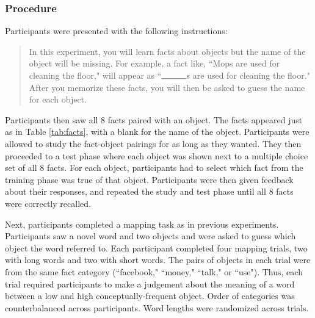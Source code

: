 \subsubsection{Procedure}
Participants were presented with the following instructions:

\begin{quote}
In this experiment, you will learn facts about objects but the name of the object will be missing. For example, a fact like, ``Mops are used for cleaning the floor," will appear as ``$\rule{1cm}{0.15mm}$s are used for cleaning the floor." After you memorize these facts, you will then be asked to guess the name for each object. 
\end{quote}
Participants  then saw  all 8 facts paired with an object. The facts appeared just as in  Table \ref{tab:facts}, with a blank for the name of the object. Participants were allowed to study the fact-object pairings for as long as they wanted. They then proceeded to a test phase where  each object was shown next to a multiple choice set of all 8 facts. For each object, participants had to select which fact from the training phase was true of that object. Participants were then given feedback about their responses, and repeated the study and test phase until all 8 facts were correctly recalled. 

Next, participants completed a mapping task as in previous experiments. Participants saw a novel word and two objects and were asked to guess which object the word referred to. Each participant completed four mapping trials, two with long words and two with short words. The pairs of objects in each trial were from the same fact category (``facebook," ``money," ``talk," or ``use"). Thus, each trial required participants to make a judgement about the meaning of a word between a low  and high conceptually-frequent object. Order of categories was counterbalanced across participants. Word lengths were randomized across trials. 

